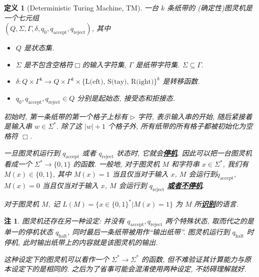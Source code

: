 \documentclass[8pt]{article}
\theoremstyle{compact}
\newtheorem{definition}{定义}[section]
\newtheorem{remark}{注}[section]
\def\obj#1{\textbf{\uline{#1}}}
\def\num#1{\textnormal{\textbf{\mbox{\textcolor{blue}{(#1)}}}}}
\begin{document}
\begin{definition}[Deterministic Turing Machine, TM]
	一台 $k$ 条纸带的 (确定性)图灵机是一个七元组 \\ $(Q, \Sigma, \Gamma, \delta, q_0, q_{\text{accept}}, q_{\text{reject}})$, 其中
	\begin{itemize}
		\item $Q$ 是状态集.
		\item $\Sigma$ 是不包含空格符$\Box$的输入字符集, $\Gamma$ 是纸带字符集. $\Sigma \subseteq \Gamma$.
		\item $\delta: Q \times \Gamma^k \to Q \times \Gamma^k \times \{\text{L(eft), S(tay), R(ight)}\}^k$ 是转移函数.
		\item $q_0, q_{\text{accept}}, q_{\text{reject}} \in Q$ 分别是起始态, 接受态和拒接态.
	\end{itemize}

	初始时, 第一条纸带的第一个格子上标有 $\triangleright$ 字符, 表示输入串的开始, 随后紧接着是输入串 $w \in \Sigma^*$. 除了这 $|w| + 1$ 个格子外, 所有纸带的所有格子都被初始化为空格符 $\Box$.

	一旦图灵机运行到 $q_{\text{accept}}$ 或者 $q_{\text{reject}}$ 状态时, 它就会\obj{停机}. 因此可以把一台图灵机看成一个 $\Sigma^* \to \{0, 1\}$ 的函数. 一般地, 对于图灵机 $M$ 和字符串 $x \in \Sigma^*$, 我们有 $M(x) \in \{0, 1\}$, 其中 $M(x) = 1$ 当且仅当对于输入 $x$, $M$ 会运行到$q_{\text{accept}}$, $M(x) = 0$ 当且仅当对于输入 $x$, $M$ 会运行到 $q_{\text{reject}}$ \obj{或者不停机}.

	对于图灵机 $M$, 记 $L(M) = \{x \in \{0, 1\}^* | M(x) = 1\}$ 为 $M$ 所\obj{识别}的语言.
\end{definition}
\begin{remark}
	图灵机还存在另一种设定: 并没有 $q_{\text{accept}}, q_{\text{reject}}$ 两个特殊状态, 取而代之的是单一的停机状态 $q_{\text{halt}}$, 同时最后一条纸带被用作“输出纸带”. 图灵机运行到 $q_{\text{halt}}$ 时停机, 此时输出纸带上的内容就是该图灵机的输出. 

	这种设定下的图灵机可以看作一个 $\Sigma^* \to \Sigma^*$ 的函数, 但不难验证其计算能力与原本设定下的是相同的. 之后为了省事可能会混淆使用两种设定, 不妨碍理解就好.
\end{remark}
\end{document}
